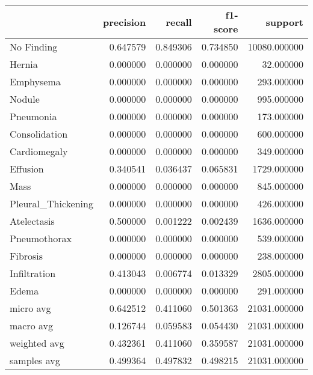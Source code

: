 \begin{tabular}{lrrrr}
\toprule
 & precision & recall & f1-score & support \\
\midrule
No Finding & 0.647579 & 0.849306 & 0.734850 & 10080.000000 \\
Hernia & 0.000000 & 0.000000 & 0.000000 & 32.000000 \\
Emphysema & 0.000000 & 0.000000 & 0.000000 & 293.000000 \\
Nodule & 0.000000 & 0.000000 & 0.000000 & 995.000000 \\
Pneumonia & 0.000000 & 0.000000 & 0.000000 & 173.000000 \\
Consolidation & 0.000000 & 0.000000 & 0.000000 & 600.000000 \\
Cardiomegaly & 0.000000 & 0.000000 & 0.000000 & 349.000000 \\
Effusion & 0.340541 & 0.036437 & 0.065831 & 1729.000000 \\
Mass & 0.000000 & 0.000000 & 0.000000 & 845.000000 \\
Pleural_Thickening & 0.000000 & 0.000000 & 0.000000 & 426.000000 \\
Atelectasis & 0.500000 & 0.001222 & 0.002439 & 1636.000000 \\
Pneumothorax & 0.000000 & 0.000000 & 0.000000 & 539.000000 \\
Fibrosis & 0.000000 & 0.000000 & 0.000000 & 238.000000 \\
Infiltration & 0.413043 & 0.006774 & 0.013329 & 2805.000000 \\
Edema & 0.000000 & 0.000000 & 0.000000 & 291.000000 \\
micro avg & 0.642512 & 0.411060 & 0.501363 & 21031.000000 \\
macro avg & 0.126744 & 0.059583 & 0.054430 & 21031.000000 \\
weighted avg & 0.432361 & 0.411060 & 0.359587 & 21031.000000 \\
samples avg & 0.499364 & 0.497832 & 0.498215 & 21031.000000 \\
\bottomrule
\end{tabular}
